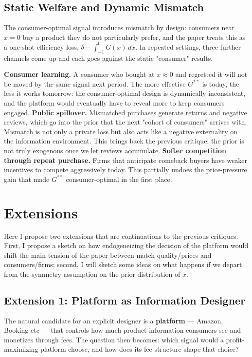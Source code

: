 \documentclass[12pt, a4paper]{article}
\begin{document}
\subsection{Static Welfare and Dynamic Mismatch}

The consumer-optimal signal introduces mismatch by design: consumers near $x = 0$ buy a product they do not particularly prefer, and the paper treats this as a one-shot efficiency loss, $\delta - \int_{-1}^{0} G(x)\,dx$. In repeated settings, three further channels come up and each goes against the static "consumer" results.


     \textbf{Consumer learning.} A consumer who bought at $x \approx 0$ and regretted it will not be moved by the same signal next period. The more effective $G^{**}$ is today, the less it works tomorrow: the consumer-optimal design is dynamically inconsistent, and the platform would eventually have to reveal more to keep consumers engaged.
    \textbf{Public spillover.} Mismatched purchases generate returns and negative reviews, which go into the prior that the next "cohort of consumers" arrives with. Mismatch is not only a private loss but also acts like a negative externality on the information environment. This brings back the previous critique: the prior is not truly exogenous once we let reviews accumulate.
    \textbf{Softer competition through repeat purchase.} Firms that anticipate comeback buyers have weaker incentives to compete aggressively today. This partially undoes the price-pressure gain that made $G^{**}$ consumer-optimal in the first place.




\section{Extensions}

Here I propose two extensions that are continuations to the previous critiques.  First, I propose a sketch on how endogeneizing the decision of the platform would shift the main tension of the paper between match quality/prices and consumers/firms; second, I will sketch some ideas on what happens if we depart from the symmetry assumption on the prior distribution of $x$.

\subsection{Extension 1: Platform as Information Designer}

The natural candidate for an explicit designer is a \textbf{platform} --- Amazon, Booking etc --- that controls how much product information consumers see and monetizes through fees. The question then becomes: which signal would a profit-maximizing platform choose, and how does its fee structure shape that choice?
\end{document}
